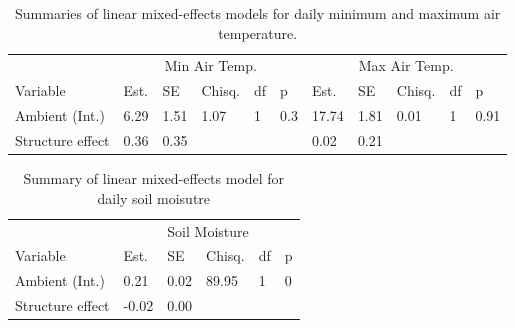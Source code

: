 \documentclass{article}
\begin{document}
\begin{table}[ht]
\centering
\caption{Summaries of linear mixed-effects models for daily minimum and maximum air temperature.} 
\label{table:shamamb_airtemp}
\begin{tabular}{p{}|p{}p{}p{}p{}p{}|p{}p{}p{}p{}p{}|}
  \hline
  &\multicolumn{5}{c}{Min Air Temp.} &\multicolumn{5}{c}{Max Air Temp.}\\
 Variable & Est. & SE & Chisq. & df & p & Est. & SE & Chisq. & df & p\\
 \hline
Ambient (Int.) & 6.29 & 1.51 & 1.07 & 1 & 0.3 & 17.74 & 1.81 & 0.01 & 1 & 0.91 \\ 
  Structure effect & 0.36 & 0.35 &  &  &  & 0.02 & 0.21 &  &  &  \\ 
   \hline
\end{tabular}
\end{table}
\begin{table}[ht]
\centering
\caption{Summary of linear mixed-effects model for daily soil moisutre} 
\label{table:shamamb_soilmois}
\begin{tabular}{p{}|p{}p{}p{}p{}p{}|}
  \hline
  &\multicolumn{5}{c}{Soil Moisture}\\
 Variable & Est. & SE & Chisq. & df & p\\
 \hline
Ambient (Int.) & 0.21 & 0.02 & 89.95 & 1 & 0 \\ 
  Structure effect & -0.02 & 0.00 &  &  &  \\ 
   \hline
\end{tabular}
\end{table}
\end{document}
